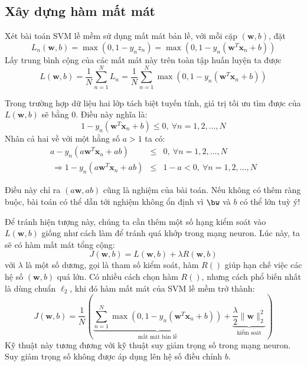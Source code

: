  
\subsection{Xây dựng hàm mất mát}
Xét bài toán SVM lề mềm sử dụng
mất mát bản lề, với mỗi cặp $(\mathbf{w}, b)$, đặt
\begin{equation} 
L_n(\mathbf{w}, b) = \max(0, 1 - y_nz_n) = \max(0, 1 -
y_n(\mathbf{w}^T\mathbf{x}_n + b))
\end{equation}  
Lấy trung bình cộng của các mất mát này trên toàn tập huấn luyện ta được
\begin{equation*} 
L(\mathbf{w}, b) = \frac{1}{N}\sum_{n=1}^N L_n = \frac{1}{N}\sum_{n=1}^N \max(0,
1 - y_n(\mathbf{w}^T\mathbf{x}_n + b))
\end{equation*} 

Trong trường hợp dữ liệu hai lớp tách biệt tuyến tính,
giá trị tối ưu tìm được của $L(\mathbf{w}, b)$ sẽ bằng 0. Điều này nghĩa là:
\begin{equation} 
1 - y_n (\mathbf{w}^T\mathbf{x}_n + b) \leq 0, ~\forall n = 1, 2, \dots, N 
\end{equation} 
Nhân cả hai về với một hằng số $a > 1$ ta có:  
\begin{eqnarray}  
a - y_n (a\mathbf{w}^T\mathbf{x}_n + ab) &\leq& 0, ~\forall n = 1, 2, \dots, N \\\ 
\Rightarrow 1 - y_n (a\mathbf{w}^T\mathbf{x}_n + ab) &\leq& 1 - a < 0, ~\forall n = 1, 2, \dots, N 
\end{eqnarray} 

Điều này chỉ ra $(a\mathbf{w}, ab)$ cũng là nghiệm của bài toán. Nếu không có thêm ràng buộc, bài toán có thể dẫn tới nghiệm không ổn định vì $\bw$ và $b$ có thể lớn tuỳ ý!  
 
Để tránh hiện tượng này, chúng ta cần thêm một số hạng kiểm soát vào $L(\mathbf{w},
b)$ giống như cách làm để 
tránh quá khớp trong mạng neuron. Lúc này, ta sẽ có hàm mất mát
tổng cộng:
\begin{equation*} 
J(\mathbf{w}, b) = L(\mathbf{w}, b) + \lambda R(\mathbf{w}, b) 
\end{equation*} 
với $\lambda$ là một số dương, gọi là tham số kiểm soát, hàm
$R()$ giúp hạn chế việc các hệ số $(\mathbf{w}, b)$ quá lớn. Có nhiều
cách chọn hàm $R()$, nhưng cách phổ biến nhất là dùng chuẩn $\ell_2$, khi đó hàm mất mát của
SVM lề mềm trở thành:
\begin{equation} 
    \label{eqn:20_21}
    J(\mathbf{w}, b) = \frac{1}{N}\left(\underbrace{\sum_{n=1}^N \max(0, 1 -
        y_n(\mathbf{w}^T\mathbf{x}_n + b))}_{\text{mất mát bản lề}} +
        \underbrace{\frac{\lambda}{2}
        \|\mathbf{w}\|_2^2}_{\text{kiểm soát}}\right)
\end{equation} 
Kỹ thuật này tương đương với kỹ thuật suy giảm trọng số trong mạng neuron. Suy giảm trọng số không được áp dụng lên hệ số điều chỉnh $b$.
 
